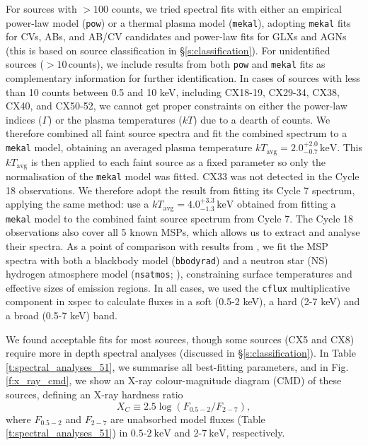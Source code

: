 \documentclass[fleqn,usenatbib]{mnras}
\newcommand{\kev}{\mbox{keV}}
\begin{document}
For sources with $>100$ counts, we tried spectral fits with either an empirical power-law model ({\tt pow}) or a thermal plasma model ({\tt mekal}), adopting {\tt mekal} fits for CVs, ABs, and AB/CV candidates and power-law fits for GLXs and AGNs (this is based on source classification in \S\ref{s:classification}). For unidentified sources ($>10$\,counts), we include results from both {\tt pow} and {\tt mekal} fits as complementary information for further identification. In cases of sources with less than 10 counts between 0.5 and 10 keV, including CX18-19, CX29-34, CX38, CX40, and CX50-52, we cannot get proper constraints on either the power-law indices ($\Gamma$) or the plasma temperatures ($kT$) due to a dearth of counts. We therefore combined all faint source spectra and fit the combined spectrum to a {\tt mekal} model, obtaining an averaged plasma temperature $kT_\mathrm{avg}=2.0^{+2.0}_{-0.7}\,\kev$. This $kT_\mathrm{avg}$ is then applied to each faint source as a fixed parameter so only the normalisation of the {\tt mekal} model was fitted. CX33 was not detected in the Cycle 18 observations. We therefore adopt the result from fitting its Cycle 7 spectrum, applying the same method: use a $kT_\mathrm{avg}=4.0^{+3.3}_{-1.3}\,\kev$ obtained from fitting a {\tt mekal} model to the combined faint source spectrum from Cycle 7. The Cycle 18 observations also cover all 5 known MSPs, which allows us to extract and analyse their spectra. As a point of comparison with results from \citet{Forestell14}, we fit the MSP spectra with both a blackbody model ({\tt bbodyrad}) and a neutron star (NS) hydrogen atmosphere model ({\tt nsatmos}; \citealt{Heinke06}), constraining surface temperatures and effective sizes of emission regions. In all cases, we used the {\tt cflux} multiplicative component in {\sc xspec} to calculate fluxes in a soft (0.5-2 keV), a hard (2-7 keV) and a broad (0.5-7 keV) band. 


We found acceptable fits for most sources, though some sources (CX5 and CX8) require more in depth spectral analyses (discussed in \S\ref{s:classification}). In Table \ref{t:spectral_analyses_51}, we summarise all best-fitting parameters, and in Fig. \ref{f:x_ray_cmd}, we show an X-ray colour-magnitude diagram (CMD) of these sources, defining an X-ray hardness ratio
\begin{equation}
    X_C \equiv 2.5\log(F_\mathrm{0.5-2}/F_\mathrm{2-7}),
    \label{eq:x_ray_hardness}
\end{equation}
where $F_\mathrm{0.5-2}$ and $F_\mathrm{2-7}$ are unabsorbed model fluxes (Table \ref{t:spectral_analyses_51}) in $0.5$-$2~\mathrm{keV}$ and $2$-$7~\mathrm{keV}$, respectively. 
\end{document}
